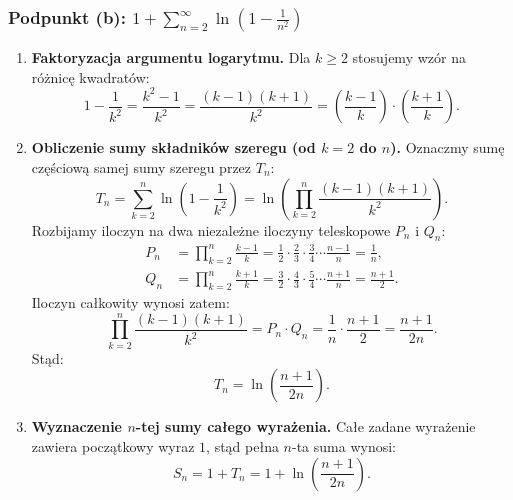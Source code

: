 \subsubsection*{Podpunkt (b): $\displaystyle 1 + \sum_{n=2}^{\infty} \ln\left(1 - \frac{1}{n^2}\right)$}

\begin{enumerate}[label=\textbf{Krok \arabic*.},leftmargin=*]
    \item \textbf{Faktoryzacja argumentu logarytmu.}
    Dla $k \geqslant 2$ stosujemy wzór na różnicę kwadratów:
    \begin{equation*}
        1 - \frac{1}{k^2} = \frac{k^2 - 1}{k^2} = \frac{(k-1)(k+1)}{k^2} = \left(\frac{k-1}{k}\right) \cdot \left(\frac{k+1}{k}\right).
    \end{equation*}

    \item \textbf{Obliczenie sumy składników szeregu (od $k = 2$ do $n$).}
    Oznaczmy sumę częściową samej sumy szeregu przez $T_n$:
    \begin{equation*}
        T_n = \sum_{k=2}^{n} \ln\left(1 - \frac{1}{k^2}\right) = \ln\left( \prod_{k=2}^{n} \frac{(k-1)(k+1)}{k^2} \right).
    \end{equation*}
    Rozbijamy iloczyn na dwa niezależne iloczyny teleskopowe $P_n$ i $Q_n$:
    \begin{align*}
        P_n &= \prod_{k=2}^{n} \frac{k-1}{k} = \frac{1}{2} \cdot \frac{2}{3} \cdot \frac{3}{4} \cdots \frac{n-1}{n} = \frac{1}{n}, \\
        Q_n &= \prod_{k=2}^{n} \frac{k+1}{k} = \frac{3}{2} \cdot \frac{4}{3} \cdot \frac{5}{4} \cdots \frac{n+1}{n} = \frac{n+1}{2}.
    \end{align*}
    Iloczyn całkowity wynosi zatem:
    \begin{equation*}
        \prod_{k=2}^{n} \frac{(k-1)(k+1)}{k^2} = P_n \cdot Q_n = \frac{1}{n} \cdot \frac{n+1}{2} = \frac{n+1}{2n}.
    \end{equation*}
    Stąd:
    \begin{equation*}
        T_n = \ln\left(\frac{n+1}{2n}\right).
    \end{equation*}

    \item \textbf{Wyznaczenie $n$-tej sumy całego wyrażenia.}
    Całe zadane wyrażenie zawiera początkowy wyraz $1$, stąd pełna $n$-ta suma wynosi:
    \begin{equation*}
        S_n = 1 + T_n = 1 + \ln\left(\frac{n+1}{2n}\right).
    \end{equation*}


\end{enumerate}
